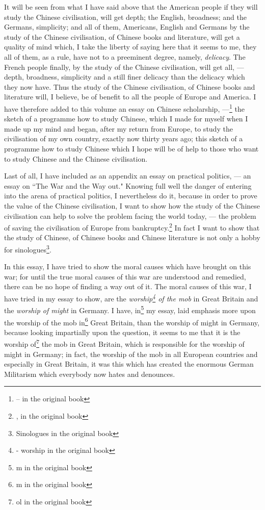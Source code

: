 It will be seen from what I have said above that the American people if they will study the Chinese civilisation, will get depth; the English, broadness; and the Germans, simplicity; and all of them, Americans, English and Germans by the study of the Chinese civilisation, of Chinese books and literature,  will get a quality of mind which, I take the liberty of saying here that it seems to me, they all of them, as a rule, have not to a preeminent degree, namely, \emph{delicacy}.
The French people finally, by the study of the Chinese civilisation, will get all, --- depth, broadness, simplicity and a still finer delicacy than the delicacy which they now have.
Thus the study of the Chinese civilisation, of Chinese books and literature will, I believe, be of benefit to all the people of Europe and America.
I have therefore added to this volume an essay on Chinese scholarship, ---\footnote{-- in the original book} the sketch of a programme how to study Chinese, which I made for myself when I made up my mind and began, after my return from Europe, to study the civilisation of my own country, exactly now thirty years ago; this sketch of a programme how to study Chinese which I hope will be of help to those who want to study Chinese and the Chinese civilisation.

Last of all, I have included as an appendix an essay on practical politics, --- an essay on ``The War and the Way out."
Knowing full well the danger of entering into the arena of practical politics, I nevertheless do it, because in order to prove the value of the Chinese civilisation, I want to show how the study of the Chinese civilisation can help to solve the problem facing the world today, --- the problem of saving the civilisation of Europe from bankruptcy.\footnote{, in the original book} 
In fact I want to show that the study of Chinese, of Chinese books and Chinese literature is not only a hobby for sinologues\footnote{Sinologues in the original book}.

In this essay, I have tried to show the moral causes which have brought on this war; for until the true moral causes of this war are understood and remedied, there can be no hope of finding a way out of it.
The moral causes of this war, I have tried in my essay to show, are the \emph{worship\footnote{- worship in the original book} of the mob} in Great Britain and the \emph{worship of might} in Germany.
I have, in\footnote{m in the original book} my essay, laid emphasis more upon the worship of the mob in\footnote{m in the original book} Great Britain, than the worship of might in Germany, because looking impartially upon the question, it seems to me that it is the worship of\footnote{ol in the original book} the mob in Great Britain, which is responsible for the worship of might in Germany; in fact, the worship of the mob in all European countries and especially in Great Britain, it was this which has created the enormous German Militarism which everybody now hates and denounces.

